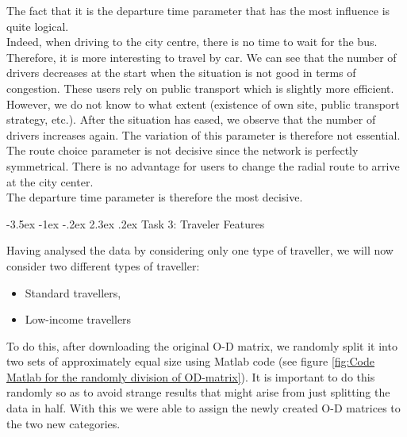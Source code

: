 \documentclass[a4paper, 12pt,oneside]{article}
\makeatletter
\renewcommand{\section}{\@startsection {section}{1}{\z@}%
             {-3.5ex \@plus -1ex \@minus -.2ex}%
             {2.3ex \@plus.2ex}%
             {\normalfont\normalsize\bfseries}}
\makeatother
\begin{document}
The fact that it is the departure time parameter that has the most influence is quite logical.\\
Indeed, when driving to the city centre, there is no time to wait for the bus. Therefore, it is more interesting to travel by car. We can see that the number of drivers decreases at the start when the situation is not good in terms of congestion. These users rely on public transport which is slightly more efficient. However, we do not know to what extent (existence of own site, public transport strategy, etc.). After the situation has eased, we observe that the number of drivers increases again. The variation of this parameter is therefore not essential.\\
The route choice parameter is not decisive since the network is perfectly symmetrical. There is no advantage for users to change the radial route to arrive at the city center.\\
The departure time parameter is therefore the most decisive.












\section{Task 3: Traveler Features}


Having analysed the data by considering only one type of traveller, we will now consider two different types of traveller:

\begin{itemize}

    \item Standard travellers,
    \item Low-income travellers

\end{itemize}

To do this, after downloading the original O-D matrix, we randomly split it into two sets of approximately equal size using Matlab code (see figure \ref{fig:Code Matlab for the randomly division of OD-matrix}). It is important to do this randomly so as to avoid strange results that might arise from just splitting the data in half. With this we were able to assign the newly created O-D matrices to the two new categories.
\end{document}
